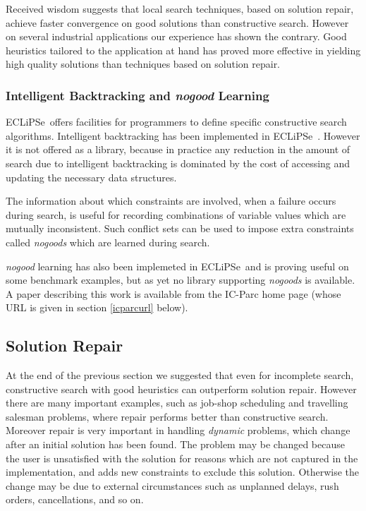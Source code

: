 \documentclass[a4wide]{article}
\newcommand{\ECL}{\mbox{ECLiPSe\ }{\hspace{1mm}}}
\begin{document}
Received wisdom suggests that local search techniques, based on
solution repair, achieve faster convergence on good solutions than
constructive search.
However on several industrial applications our experience has
shown the contrary.
Good heuristics tailored to the application at hand has proved more
effective in yielding high quality solutions than techniques based on
solution repair.

\subsubsection{Intelligent Backtracking and {\em nogood} Learning}
\ECL offers facilities for programmers to define specific constructive
search algorithms.
Intelligent backtracking has been implemented in \ECL.
However it is
not offered as a library, because in practice any reduction in the
amount of 
search due to intelligent backtracking is dominated by the cost of
accessing and updating the necessary data structures.

The information about which constraints are involved, when a
failure occurs during search, is useful for recording combinations of
variable values which are mutually inconsistent.
Such conflict sets can be used to impose extra constraints called {\em
nogoods} which are learned during search.

{\em nogood} learning has also been implemeted in \ECL and is proving
useful on some benchmark examples, but as yet no library supporting
{\em nogoods} is available.  A paper describing this work
\cite{nogoods} is available from the 
IC-Parc home page 
(whose URL is given in section \ref{icparcurl} below).

\subsection{Solution Repair}
At the end of the previous section we suggested that even for
incomplete search, constructive search with good heuristics can
outperform solution repair.
However there are many important examples,  such as job-shop
scheduling and travelling salesman problems, where repair performs
better than constructive search.
Moreover repair is very important in handling {\em dynamic} problems,
which change after an initial solution has been found.
The problem may be changed because the user is unsatisfied with the
solution for reasons which are not captured in the implementation, and
adds new constraints to exclude this solution.
Otherwise the change may be due to external circumstances such as
unplanned delays, rush orders, cancellations, and so on.
\end{document}
